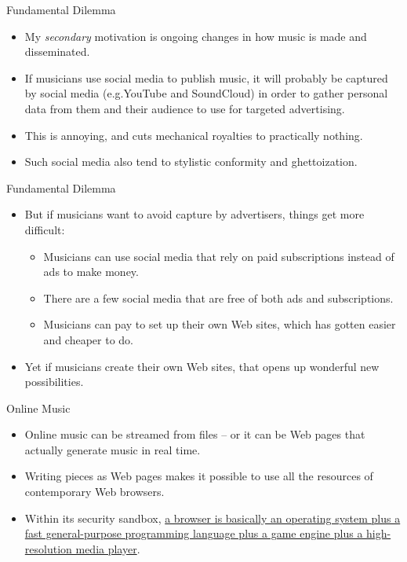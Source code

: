 \documentclass{beamer}
\begin{document}
\begin{frame}{Fundamental Dilemma}
\begin{itemize}
\item My \emph{secondary} motivation is ongoing changes in how music is made and disseminated.
\item If musicians use social media to publish music, it will probably be captured by social media (e.g.YouTube and SoundCloud) in order to gather personal   data from them and their audience to use for targeted advertising.
\item This is annoying, and cuts mechanical royalties to practically nothing.
\item Such social media also tend to stylistic conformity and ghettoization.
\end{itemize}
\end{frame}

\begin{frame}{Fundamental Dilemma}
\begin{itemize}
\item But if musicians want to avoid capture by advertisers, things get more difficult:
\begin{itemize}
\item Musicians can use social media that rely on paid subscriptions instead of ads to make money.
\item There are a few social media that are free of both ads and subscriptions.
\item Musicians can pay to set up their own Web sites, which has gotten easier and cheaper to do.
\end{itemize}
\item Yet if musicians create their own Web sites, that opens up wonderful new possibilities.
\end{itemize}
\end{frame}

\begin{frame}{Online Music}
\begin{itemize}
\item Online music can be streamed from files -- or it can be Web pages that actually generate music in real time.
\item Writing pieces as Web pages makes it possible to use all the resources of contemporary Web browsers.
\item Within its security sandbox, \href{https://html5test.co/}{a browser is basically an operating system plus a fast general-purpose programming language plus a game engine plus a high-resolution media player}.
\end{itemize}
\end{frame}
\end{document}
